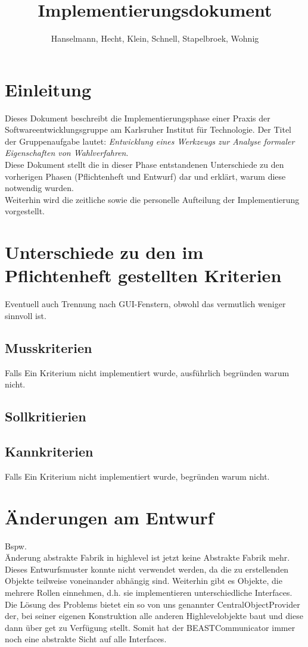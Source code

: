 \documentclass[a4paper]{scrreprt}
\begin{document}
\title{Implementierungsdokument}
\author{Hanselmann, Hecht, Klein, Schnell, Stapelbroek, Wohnig}
\maketitle 
\tableofcontents	
\listoffigures


\chapter{Einleitung}
Dieses Dokument beschreibt die Implementierungsphase einer Praxis der Softwareentwicklungsgruppe am Karlsruher Institut für Technologie. Der Titel der Gruppenaufgabe lautet: \textit{Entwicklung eines Werkzeugs zur Analyse formaler Eigenschaften von Wahlverfahren}. \\
Diese Dokument stellt die in dieser Phase entstandenen Unterschiede zu den vorherigen Phasen (Pflichtenheft und Entwurf) dar und erklärt, warum diese notwendig wurden. \\
Weiterhin wird die zeitliche sowie die personelle Aufteilung der Implementierung vorgestellt. \\



\chapter{Unterschiede zu den im Pflichtenheft gestellten Kriterien}


Eventuell auch Trennung nach GUI-Fenstern, obwohl das vermutlich weniger sinnvoll ist.
\section{Musskriterien}
Falls Ein Kriterium nicht implementiert wurde, ausführlich begründen warum nicht.

\section{Sollkritierien}
\section{Kannkriterien}
Falls Ein Kriterium nicht implementiert wurde, begründen warum nicht. 

\chapter{Änderungen am Entwurf}
Bspw. \\
Änderung abstrakte Fabrik in highlevel ist jetzt keine Abstrakte Fabrik mehr.\\ Dieses Entwurfsmuster konnte nicht verwendet werden, da die zu erstellenden Objekte teilweise voneinander abhängig sind. Weiterhin gibt es Objekte, die mehrere Rollen einnehmen, d.h. sie implementieren unterschiedliche Interfaces. \\
Die Lösung des Problems bietet ein so von uns genannter CentralObjectProvider der, bei seiner eigenen Konstruktion alle anderen Highlevelobjekte baut und diese dann über get zu Verfügung stellt.
Somit hat der BEASTCommunicator immer noch eine abstrakte Sicht auf alle Interfaces.
\end{document}
